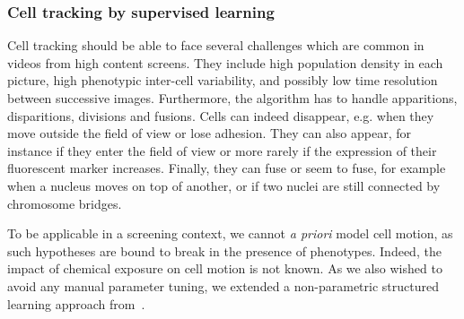 \subsubsection{Cell tracking by supervised learning}
Cell tracking should be able to face several challenges which are
common in videos from high content screens. They
include high population density in each picture, high phenotypic
inter-cell variability, and possibly low time resolution between
successive images. Furthermore, the algorithm has to handle
apparitions, disparitions, divisions and fusions. Cells can indeed disappear, e.g. when they move outside the field of view or lose adhesion. They can also appear, for instance if they enter the field of view or more rarely if the expression of their fluorescent marker increases. Finally, they can fuse or seem to fuse, for example when a nucleus moves on top of another, or if two nuclei are still connected by chromosome bridges. %

To be applicable in a screening context, we cannot \textit{a priori}
model cell motion, as such hypotheses are bound to break in the
presence of phenotypes. Indeed, the impact of chemical exposure on
cell motion is not known. As we also wished to avoid any manual parameter tuning, we extended a non-parametric structured learning approach from~\cite{lou}. %

